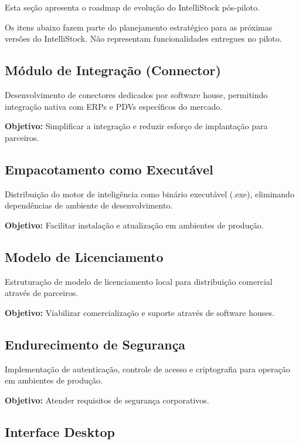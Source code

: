 Esta seção apresenta o roadmap de evolução do IntelliStock pós-piloto.

\begin{infobox}
Os itens abaixo fazem parte do planejamento estratégico para as próximas
versões do IntelliStock. Não representam funcionalidades entregues no piloto.
\end{infobox}

\subsection{Módulo de Integração (Connector)}

Desenvolvimento de conectores dedicados por software house, permitindo
integração nativa com ERPs e PDVs específicos do mercado.

\textbf{Objetivo:} Simplificar a integração e reduzir esforço de
implantação para parceiros.

\subsection{Empacotamento como Executável}

Distribuição do motor de inteligência como binário executável (.exe),
eliminando dependências de ambiente de desenvolvimento.

\textbf{Objetivo:} Facilitar instalação e atualização em ambientes
de produção.

\subsection{Modelo de Licenciamento}

Estruturação de modelo de licenciamento local para distribuição
comercial através de parceiros.

\textbf{Objetivo:} Viabilizar comercialização e suporte através de
software houses.

\subsection{Endurecimento de Segurança}

Implementação de autenticação, controle de acesso e criptografia
para operação em ambientes de produção.

\textbf{Objetivo:} Atender requisitos de segurança corporativos.

\subsection{Interface Desktop}

